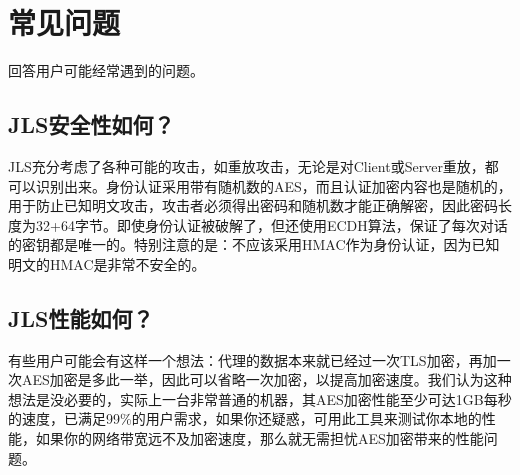 
\chapter{常见问题}
回答用户可能经常遇到的问题。

\section{JLS安全性如何？}
JLS充分考虑了各种可能的攻击，如重放攻击，无论是对Client或Server重放，都可以识别出来。身份认证采用带有随机数的AES，而且认证加密内容也是随机的，用于防止已知明文攻击，攻击者必须得出密码和随机数才能正确解密，因此密码长度为32+64字节。即使身份认证被破解了，但还使用ECDH算法，保证了每次对话的密钥都是唯一的。特别注意的是：不应该采用HMAC作为身份认证，因为已知明文的HMAC是非常不安全的。

\section{JLS性能如何？}
有些用户可能会有这样一个想法：代理的数据本来就已经过一次TLS加密，再加一次AES加密是多此一举，因此可以省略一次加密，以提高加密速度。我们认为这种想法是没必要的，实际上一台非常普通的机器，其AES加密性能至少可达1GB每秒的速度，已满足99\%的用户需求，如果你还疑惑，可用此工具来测试你本地的性能，如果你的网络带宽远不及加密速度，那么就无需担忧AES加密带来的性能问题。
